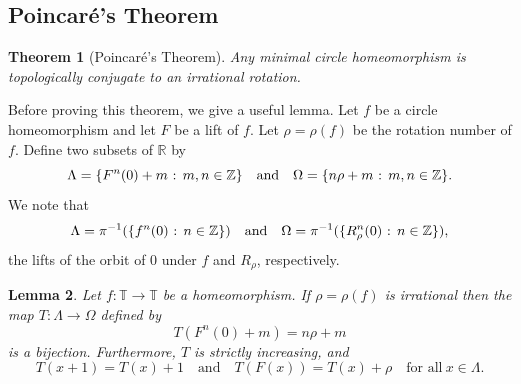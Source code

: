 \documentclass[12pt]{article}
\newtheorem{theorem}{Theorem}[section]
\newtheorem{lemma}[theorem]{Lemma}
\theoremstyle{definition}
\theoremstyle{remark}
\begin{document}
\subsection{Poincar\'e's Theorem}

\begin{theorem}[Poincar\'e's Theorem] \label{poinare_theorem}
Any minimal circle homeomorphism is topologically conjugate to an irrational rotation.
\end{theorem}

Before proving this theorem, we give a useful lemma. Let $f$ be a circle homeomorphism and let
$F$ be a lift of $f$. Let $\rho=\rho(f)$ be the rotation number of $f$.
Define two subsets of $\mathbb R$ by
\[
\Lambda= \{F^n(0) +m \hbox{ : } m,n \in \mathbb Z\}
\quad \mbox{and} \quad
\Omega = \{n\rho+m \hbox{ : } m,n \in \mathbb Z\}.
\]
We note that 
\[
\Lambda = \pi^{-1}(\{f^n(0) \hbox{ : } n \in \mathbb Z\})
\quad \mbox{and} \quad
\Omega = \pi^{-1}(\{R_\rho^n(0) \hbox{ : } n \in \mathbb Z\}),
\]
the lifts of the orbit of $0$ under $f$ and $R_\rho$, respectively.

\begin{lemma} \label{lemma_for_poincare}
Let $f : \mathbb T \to \mathbb T$ be a homeomorphism.
If $\rho = \rho(f)$ is irrational  then the map 
$T : \Lambda \to \Omega$ defined by
\[
T(F^n(0) +m) = n\rho +m
\]
is a bijection. Furthermore, $T$ is strictly increasing, and
\[
T(x+1) = T(x)+1 \quad \text{and} \quad
T(F(x)) = T(x)+\rho \quad \text{for all} \ x \in \Lambda.
\]
\end{lemma}
\end{document}
